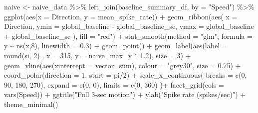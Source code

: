 \documentclass[
]{book}
\newenvironment{Shaded}{\begin{snugshade}}{\end{snugshade}}
\newcommand{\AttributeTok}[1]{\textcolor[rgb]{0.77,0.63,0.00}{#1}}
\newcommand{\DecValTok}[1]{\textcolor[rgb]{0.00,0.00,0.81}{#1}}
\newcommand{\FloatTok}[1]{\textcolor[rgb]{0.00,0.00,0.81}{#1}}
\newcommand{\FunctionTok}[1]{\textcolor[rgb]{0.00,0.00,0.00}{#1}}
\newcommand{\NormalTok}[1]{#1}
\newcommand{\OtherTok}[1]{\textcolor[rgb]{0.56,0.35,0.01}{#1}}
\newcommand{\SpecialCharTok}[1]{\textcolor[rgb]{0.00,0.00,0.00}{#1}}
\newcommand{\StringTok}[1]{\textcolor[rgb]{0.31,0.60,0.02}{#1}}
\begin{document}
\begin{Shaded}
\begin{Highlighting}[]
\NormalTok{naive }\OtherTok{\textless{}{-}}
\NormalTok{  naive\_data }\SpecialCharTok{\%\textgreater{}\%}
  \FunctionTok{left\_join}\NormalTok{(baseline\_summary\_df, }\AttributeTok{by =} \StringTok{"Speed"}\NormalTok{) }\SpecialCharTok{\%\textgreater{}\%}
  \FunctionTok{ggplot}\NormalTok{(}\FunctionTok{aes}\NormalTok{(}\AttributeTok{x =}\NormalTok{ Direction, }\AttributeTok{y =}\NormalTok{ mean\_spike\_rate)) }\SpecialCharTok{+}
  \FunctionTok{geom\_ribbon}\NormalTok{(}\FunctionTok{aes}\NormalTok{(}
    \AttributeTok{x =}\NormalTok{ Direction,}
    \AttributeTok{ymin =}\NormalTok{ global\_baseline }\SpecialCharTok{{-}}\NormalTok{ global\_baseline\_se,}
    \AttributeTok{ymax =}\NormalTok{ global\_baseline }\SpecialCharTok{+}\NormalTok{ global\_baseline\_se}
\NormalTok{  ),}
  \AttributeTok{fill =} \StringTok{"red"}\NormalTok{) }\SpecialCharTok{+}
  \FunctionTok{stat\_smooth}\NormalTok{(}\AttributeTok{method =} \StringTok{"glm"}\NormalTok{, }\AttributeTok{formula =}\NormalTok{ y }\SpecialCharTok{\textasciitilde{}} \FunctionTok{ns}\NormalTok{(x,}\DecValTok{8}\NormalTok{), }\AttributeTok{linewidth =} \FloatTok{0.3}\NormalTok{) }\SpecialCharTok{+}
  \FunctionTok{geom\_point}\NormalTok{() }\SpecialCharTok{+}
  \FunctionTok{geom\_label}\NormalTok{(}\FunctionTok{aes}\NormalTok{(}\AttributeTok{label =} \FunctionTok{round}\NormalTok{(si, }\DecValTok{2}\NormalTok{) , }\AttributeTok{x =} \DecValTok{315}\NormalTok{, }\AttributeTok{y =}\NormalTok{ naive\_max\_y }\SpecialCharTok{*} \FloatTok{1.2}\NormalTok{),}
             \AttributeTok{size =} \DecValTok{3}\NormalTok{) }\SpecialCharTok{+}
  \FunctionTok{geom\_vline}\NormalTok{(}\FunctionTok{aes}\NormalTok{(}\AttributeTok{xintercept =}\NormalTok{ vector\_sum), }\AttributeTok{colour =} \StringTok{"grey30"}\NormalTok{,}
             \AttributeTok{size =} \FloatTok{0.75}\NormalTok{) }\SpecialCharTok{+}
  \FunctionTok{coord\_polar}\NormalTok{(}\AttributeTok{direction =} \DecValTok{1}\NormalTok{, }\AttributeTok{start =}\NormalTok{ pi}\SpecialCharTok{/}\DecValTok{2}\NormalTok{) }\SpecialCharTok{+}
  \FunctionTok{scale\_x\_continuous}\NormalTok{(}
    \AttributeTok{breaks =} \FunctionTok{c}\NormalTok{(}\DecValTok{0}\NormalTok{, }\DecValTok{90}\NormalTok{, }\DecValTok{180}\NormalTok{, }\DecValTok{270}\NormalTok{),}
    \AttributeTok{expand =} \FunctionTok{c}\NormalTok{(}\DecValTok{0}\NormalTok{, }\DecValTok{0}\NormalTok{),}
    \AttributeTok{limits =} \FunctionTok{c}\NormalTok{(}\DecValTok{0}\NormalTok{, }\DecValTok{360}\NormalTok{)}
\NormalTok{  )}\SpecialCharTok{+}
  \FunctionTok{facet\_grid}\NormalTok{(}\AttributeTok{cols =} \FunctionTok{vars}\NormalTok{(Speed)) }\SpecialCharTok{+}
  \FunctionTok{ggtitle}\NormalTok{(}\StringTok{"Full 3{-}sec motion"}\NormalTok{) }\SpecialCharTok{+}
  \FunctionTok{ylab}\NormalTok{(}\StringTok{"Spike rate (spikes/sec)"}\NormalTok{) }\SpecialCharTok{+}
  \FunctionTok{theme\_minimal}\NormalTok{()}
\end{Highlighting}
\end{Shaded}
\end{document}
